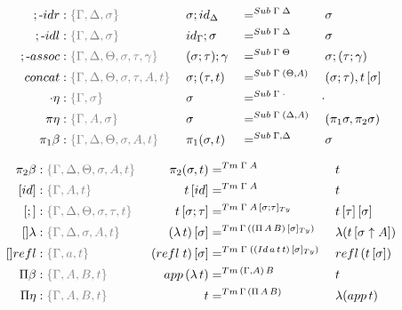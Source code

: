 \documentclass[a4paper,UKenglish,numberwithinsect,cleveref,thm-restate]{lipics-v2021}
\begin{document}
\begin{alignat*}{5}
  ;\text{-}\mathsf{idr}    & : \implicit{\Gamma, \Delta, \sigma}\; && {\sigma ; \idS_{\Delta}} && =^{\Sub\;\Gamma\;\Delta} && {\sigma} \\
  ;\text{-}\mathsf{idl}    & : \implicit{\Gamma, \Delta, \sigma}\; && {\idS_{\Gamma} ; \sigma} && =^{\Sub\;\Gamma\;\Delta} && {\sigma} \\
  ;\text{-}\mathsf{assoc} & : \implicit{\Gamma, \Delta, \Theta, \sigma, \tau, \gamma}\; && (\sigma ; \tau) ; \gamma && =^{\Sub\;\Gamma\;\Theta} &&  \sigma ; (\tau ; \gamma) \\
  \mathsf{concat} & : \implicit{\Gamma, \Delta, \Theta, \sigma, \tau, A, t}\; &&\sigma ; (\tau , t) && =^{\Sub\;\Gamma\;(\Theta, A)} &&  (\sigma ; \tau) , \sub{t}{\sigma} \\
  \emptyctx\eta   & : \implicit{\Gamma, \sigma}\; && \sigma                   && =^{\Sub\;\Gamma\;\emptyctx} & \emptysub \\
  \pi\eta         & : \implicit{\Gamma, A, \sigma}\; && \sigma                   && =^{\Sub\;\Gamma\;(\Delta, A)} &&  (\pi_1 \sigma, \pi_2 \sigma) \\
  \pi_1\beta      & : \implicit{\Gamma, \Delta, \Theta, \sigma, A, t}\; && \pi_1(\sigma , t)        && =^{\Sub\;\Gamma,\Delta} &&  \sigma
\end{alignat*}

\begin{alignat*}{5}
  \pi_2\beta      & : \implicit{\Gamma, \Delta, \Theta, \sigma, A, t}\;  & \pi_2(\sigma , t)                & =^{\Tm\;\Gamma\; A} &&  t \\
  [\idS]         & : \implicit{\Gamma, A, t}\;                           & {\sub{t}{\idS}}                  & =^{\Tm\;\Gamma\;A} && t \\
  [;]            & :\implicit{\Gamma, \Delta, \Theta, \sigma, \tau, t}\; & {\sub{t}{\sigma ; \tau}}         & =^{\Tm\;\Gamma\;\subTy{A}{\sigma ; \tau}} && {\sub{\sub{t}{\tau}}{\sigma}} \\
  []\lambda       & : \implicit{\Gamma, \Delta, \sigma, A, t}\;          & \sub{(\lambda\,t)}{\sigma}       & =^{\Tm\,\Gamma\,(\subTy{(\Pi\,A\,B)}{\sigma})} {} && \lambda (\sub{t}{\sigma \uparrow A}) \\
  []\mathsf{refl} & : \implicit{\Gamma, a, t}\;                          & \sub{(\mathsf{refl}\;t)}{\sigma} & =^{\Tm\;\Gamma\;(\subTy{(\mathsf{Id}\,a\,t\,t)}{\sigma})} {} && \mathsf{refl}\,(\sub{t}{\sigma}) \\
  \Pi\beta        & : \implicit{\Gamma, A, B, t}\;                       & \mathsf{app}\,(\lambda\,t)       & =^{\Tm\,(\Gamma, A)\,B} && t \\
  \Pi\eta         & : \implicit{\Gamma, A, B, t}\;                       & t                                & =^{\Tm\,\Gamma\,(\Pi\,A\,B)} && \lambda(\mathsf{app}\,t)
\end{alignat*}
\end{document}
